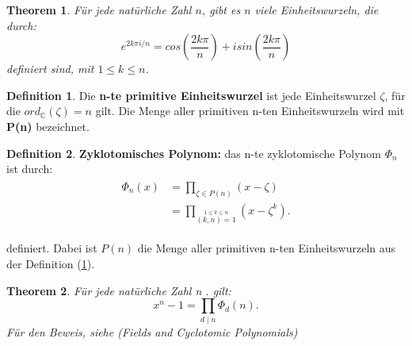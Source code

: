 \documentclass[12pt,oneside]{article}
\newtheorem{theorem}{Theorem}[section]
\theoremstyle{remark}
\theoremstyle{definition}
\newtheorem{definition}{Definition}[section]
\begin{document}
\smallskip

\begin{theorem}
Für jede natürliche Zahl $n$, gibt es $n$ viele Einheitswurzeln, die durch:\newline
\begin{equation}
    e^{2k\pi i/n} = cos(\frac{2k \pi }{n}) + i sin(\frac{2k \pi}{n})
\end{equation}
definiert sind, mit $1 \leq k \leq n$.
\end{theorem}

\smallskip


\smallskip

\begin{definition}\label{prim_ein}
Die \textbf{n-te primitive Einheitswurzel} ist jede Einheitswurzel $\zeta$, für die $ord_{\mathbb{C}}(\zeta) = n $ gilt. Die Menge aller primitiven n-ten Einheitswurzeln wird mit \textbf{P(n)} bezeichnet. 
\end{definition}

\smallskip

\begin{definition}\label{def_cyc_poly}
\textbf{Zyklotomisches Polynom:} das n-te zyklotomische Polynom $\Phi_{n}$ ist durch:\newline
\begin{equation}
    \begin{split}
        \begin{aligned}
            \Phi_{n}(x) &= \prod_{\zeta \in P(n)} (x -\zeta) \\
            &= \prod _{\stackrel {1\leq k\leq n}{(k,n)=1}}\left(x- \zeta^k\right).
        \end{aligned}
    \end{split}
\end{equation}

definiert. Dabei ist $P(n)$ die Menge aller primitiven n-ten Einheitswurzeln aus der Definition (\ref{prim_ein}). 
\end{definition}

\smallskip

\begin{theorem}\label{impor_cyc_lemma}
Für jede natürliche Zahl n . gilt:\newline
\begin{equation}
    x^n - 1 = \prod_{d \mid n} \Phi_{d}(n).
\end{equation}
Für den Beweis, siehe (Fields and Cyclotomic Polynomials) 
\end{theorem}
\end{document}
